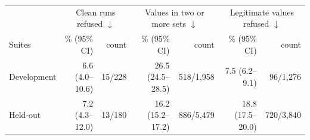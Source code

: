 \begin{tabular}{@{}lrrrrrr@{}}
\toprule
 & \multicolumn{2}{c}{Clean runs refused $\downarrow$} & \multicolumn{2}{c}{Values in two or more sets $\downarrow$} & \multicolumn{2}{c}{Legitimate values refused $\downarrow$} \\
Suites & \% (95\% CI) & count & \% (95\% CI) & count & \% (95\% CI) & count \\
\midrule
Development & 6.6 (4.0--10.6) & 15/228 & 26.5 (24.5--28.5) & 518/1,958 & 7.5 (6.2--9.1) & 96/1,276 \\
Held-out & 7.2 (4.3--12.0) & 13/180 & 16.2 (15.2--17.2) & 886/5,479 & 18.8 (17.5--20.0) & 720/3,840 \\
\bottomrule
\end{tabular}
